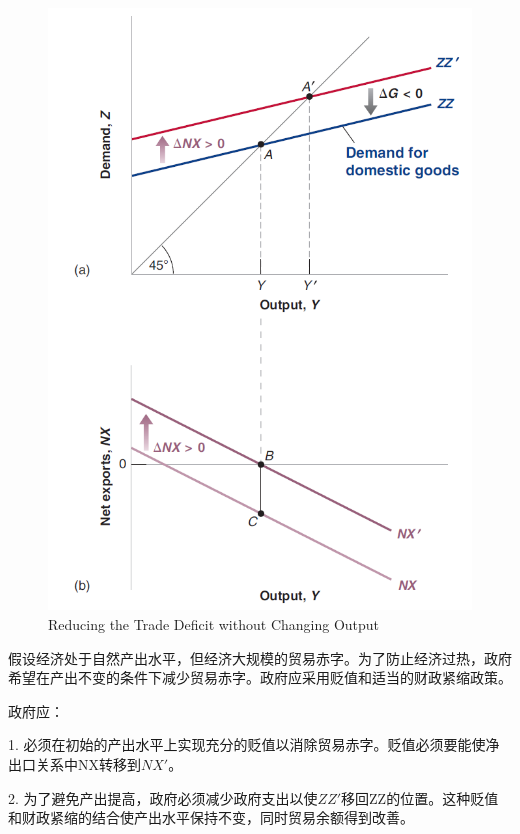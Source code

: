 \documentclass{article}
\begin{document}
\begin{figure}[H] %
	\centering %
	\includegraphics[width=1\textwidth]{18_7} %
	\caption{Reducing the Trade Deficit
		without Changing Output} %
	\label{Fig.main7} %
\end{figure}

假设经济处于自然产出水平，但经济大规模的贸易赤字。为了防止经济过热，政府希望在产出不变的条件下减少贸易赤字。政府应采用贬值和适当的财政紧缩政策。

政府应：

1. 必须在初始的产出水平上实现充分的贬值以消除贸易赤字。贬值必须要能使净出口关系中NX转移到$ NX' $。

2. 为了避免产出提高，政府必须减少政府支出以使$ ZZ' $移回ZZ的位置。这种贬值和财政紧缩的结合使产出水平保持不变，同时贸易余额得到改善。
\end{document}

